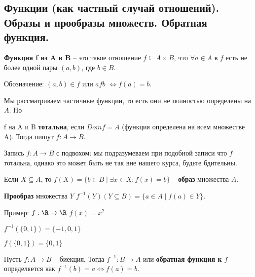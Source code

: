\subsection{Функции (как частный случай отношений). Образы и прообразы множеств. Обратная функция.}

\textbf{Функция f из A в B} -- это такое отношение $f \subseteq A \times B$, что $\forall a \in A$ в $f$ есть не более одной пары $(a, b)$, где $b \in B$.

Обозначение: $(a, b) \in f$ или $afb$ $\Leftrightarrow f(a) = b$.

Мы рассматриваем частичные функции, то есть они не полностью определены на $A$. Но

f на A и B \textbf{тотальна}, если $Dom f = A$ (функция определена на всем множестве A). Тогда пишут $f: A \rightarrow B$.

Запись $f: A \rightarrow B$ с подвохом: мы подразумеваем при подобной записи что $f$ тотальна, однако это может быть не так вне нашего курса, будьте бдительны.

Если $X \subseteq A$, то $f(X) = \{b \in B \mid \exists x \in X: f(x) = b\}$ -- \textbf{образ} множества $A$.

\textbf{Прообраз} множества $Y$ $f^{-1}(Y) (Y \subseteq B) = \{a \in A \mid f(a) \in Y\}$.

Пример: $f: \R \rightarrow \R$ $f(x) = x^2$

$f^{-1}(\{0, 1\}) = \{-1, 0, 1\}$

$f(\{0, 1\}) = \{0, 1\}$

Пусть $f: A \rightarrow B$ -- биекция. Тогда $f^{-1}: B \rightarrow A$ или \textbf{обратная функция к $f$} определяется как $f^{-1}(b) = a \Leftrightarrow f(a) = b$.

